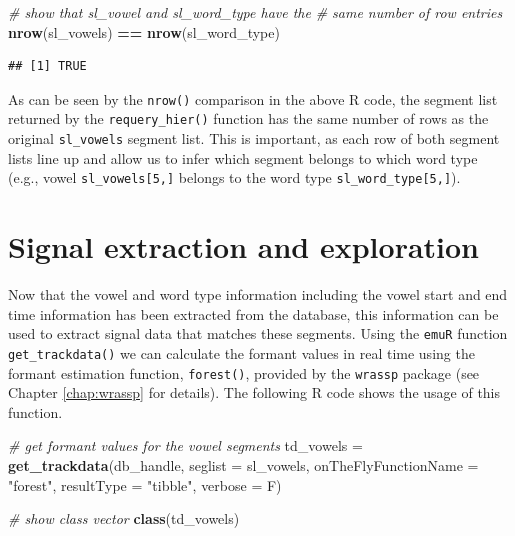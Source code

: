 \documentclass[]{book}
\newenvironment{Shaded}{\begin{snugshade}}{\end{snugshade}}
\newcommand{\CommentTok}[1]{\textcolor[rgb]{0.56,0.35,0.01}{\textit{#1}}}
\newcommand{\DataTypeTok}[1]{\textcolor[rgb]{0.13,0.29,0.53}{#1}}
\newcommand{\KeywordTok}[1]{\textcolor[rgb]{0.13,0.29,0.53}{\textbf{#1}}}
\newcommand{\NormalTok}[1]{#1}
\newcommand{\OperatorTok}[1]{\textcolor[rgb]{0.81,0.36,0.00}{\textbf{#1}}}
\newcommand{\StringTok}[1]{\textcolor[rgb]{0.31,0.60,0.02}{#1}}
\begin{document}
\begin{Shaded}
\begin{Highlighting}[]
\CommentTok{# show that sl_vowel and sl_word_type have the}
\CommentTok{# same number of row entries}
\KeywordTok{nrow}\NormalTok{(sl_vowels) }\OperatorTok{==}\StringTok{ }\KeywordTok{nrow}\NormalTok{(sl_word_type)}
\end{Highlighting}
\end{Shaded}

\begin{verbatim}
## [1] TRUE
\end{verbatim}

As can be seen by the \texttt{nrow()} comparison in the above R code, the segment list returned by the \texttt{requery\_hier()} function has the same number of rows as the original \texttt{sl\_vowels} segment list. This is important, as each row of both segment lists line up and allow us to infer which segment belongs to which word type (e.g., vowel \texttt{sl\_vowels{[}5,{]}} belongs to the word type \texttt{sl\_word\_type{[}5,{]}}).

\hypertarget{section:tutorial-sigExtrAndExpl}{%
\section{Signal extraction and exploration}\label{section:tutorial-sigExtrAndExpl}}

Now that the vowel and word type information including the vowel start and end time information has been extracted from the database, this information can be used to extract signal data that matches these segments. Using the \texttt{emuR} function \texttt{get\_trackdata()} we can calculate the formant values in real time using the formant estimation function, \texttt{forest()}, provided by the \texttt{wrassp} package (see Chapter \ref{chap:wrassp} for details). The following R code shows the usage of this function.

\begin{Shaded}
\begin{Highlighting}[]
\CommentTok{# get formant values for the vowel segments}
\NormalTok{td_vowels =}\StringTok{ }\KeywordTok{get_trackdata}\NormalTok{(db_handle,}
                          \DataTypeTok{seglist =}\NormalTok{ sl_vowels,}
                          \DataTypeTok{onTheFlyFunctionName =} \StringTok{"forest"}\NormalTok{,}
                          \DataTypeTok{resultType =} \StringTok{"tibble"}\NormalTok{,}
                          \DataTypeTok{verbose =}\NormalTok{ F)}

\CommentTok{# show class vector}
\KeywordTok{class}\NormalTok{(td_vowels)}
\end{Highlighting}
\end{Shaded}
\end{document}
